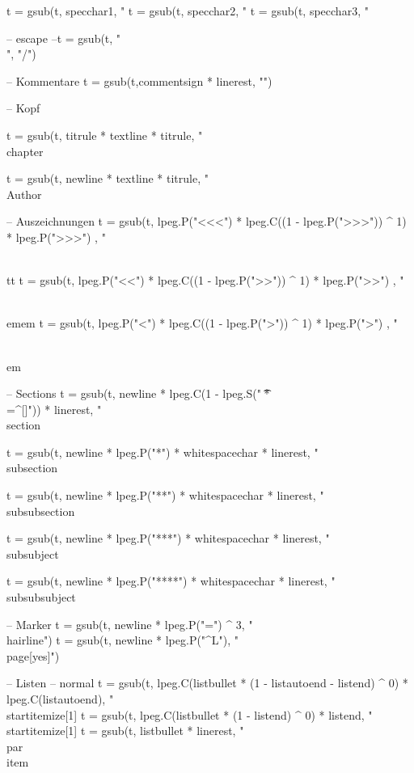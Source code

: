     t = gsub(t, specchar1, "%
    t = gsub(t, specchar2, "%
    t = gsub(t, specchar3, "%
    
    -- escape
    --t = gsub(t, "\\", "/")   
    
    -- Kommentare
    t = gsub(t,commentsign * linerest, "\n")

    -- Kopf
    
    t = gsub(t, titrule * textline * titrule, "\\chapter{%
    t = gsub(t, newline * textline * titrule, "\n\\Author{%
    
    -- Auszeichnungen
    t = gsub(t, lpeg.P("<<<") * lpeg.C((1 - lpeg.P(">>>")) ^ 1) * lpeg.P(">>>") , "{\\tt %
    t = gsub(t, lpeg.P("<<") * lpeg.C((1 - lpeg.P(">>")) ^ 1) * lpeg.P(">>") , "{\\emem %
    t = gsub(t, lpeg.P("<") * lpeg.C((1 - lpeg.P(">")) ^ 1) * lpeg.P(">") , "{\\em %
    
    -- Sections
    t = gsub(t, newline * lpeg.C(1 - lpeg.S(" \t\n@*\\=^[]")) * linerest, "\n\\section{%
    t = gsub(t, newline * lpeg.P("*") * whitespacechar * linerest, "\n\\subsection{%
    t = gsub(t, newline * lpeg.P("**") * whitespacechar * linerest, "\n\\subsubsection{%
    t = gsub(t, newline * lpeg.P("***") * whitespacechar * linerest, "\n\\subsubject{%
    t = gsub(t, newline * lpeg.P("****") * whitespacechar * linerest, "\n\\subsubsubject{%
    
    -- Marker
    t = gsub(t, newline * lpeg.P("=") ^ 3, "\\hairline")
    t = gsub(t, newline * lpeg.P("^L"), "\\page[yes]")

    -- Listen
      -- normal
    t = gsub(t, lpeg.C(listbullet * (1 - listautoend - listend) ^ 0) * lpeg.C(listautoend), "\n\n\\startitemize[1]\n%
    t = gsub(t, lpeg.C(listbullet * (1 - listend) ^ 0) * listend, "\n\n\\startitemize[1]\n%
    t = gsub(t, listbullet * linerest, "\n\\par\\item %
    
}}}}}}}}}}

